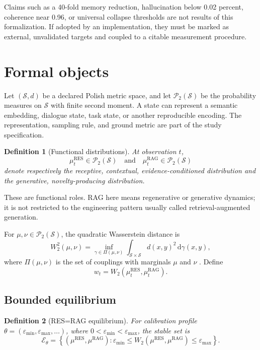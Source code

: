 \documentclass[11pt]{article}
\newcommand{\RES}{\mathrm{RES}}
\newcommand{\RAG}{\mathrm{RAG}}
\newcommand{\Wtwo}{W_2}
\newcommand{\Ptwo}{\mathcal P_2}
\newcommand{\State}{\mathcal S}
\newcommand{\Eband}{\mathcal E_{\theta}}
\newtheorem{definition}{Definition}
\begin{document}
Claims such as a 40-fold memory reduction, hallucination below
0.02 percent, coherence near 0.96, or universal collapse thresholds are not
results of this formalization. If adopted by an implementation, they must be
marked as external, unvalidated targets and coupled to a citable measurement
procedure.

\section{Formal objects}

Let $(\State,d)$ be a declared Polish metric space, and let
$\Ptwo(\State)$ be the probability measures on $\State$ with finite second
moment. A state can represent a semantic embedding, dialogue state, task state,
or another reproducible encoding. The representation, sampling rule, and ground
metric are part of the study specification.

\begin{definition}[Functional distributions]
At observation $t$,
\[
\mu_t^{\RES}\in\Ptwo(\State)
\quad\text{and}\quad
\mu_t^{\RAG}\in\Ptwo(\State)
\]
denote respectively the receptive, contextual, evidence-conditioned
distribution and the generative, novelty-producing distribution.
\end{definition}

These are functional roles. RAG here means regenerative or generative
dynamics; it is not restricted to the engineering pattern usually called
retrieval-augmented generation.

For $\mu,\nu\in\Ptwo(\State)$, the quadratic Wasserstein distance is
\begin{equation}
\Wtwo^2(\mu,\nu)
=
\inf_{\gamma\in\Pi(\mu,\nu)}
\int_{\State\times\State}d(x,y)^2\,\mathrm d\gamma(x,y),
\label{eq:w2}
\end{equation}
where $\Pi(\mu,\nu)$ is the set of couplings with marginals $\mu$ and $\nu$
\citep{villani2009,ambrosio2008}. Define
\begin{equation}
w_t=\Wtwo\!\left(\mu_t^{\RES},\mu_t^{\RAG}\right).
\label{eq:separation}
\end{equation}

\subsection{Bounded equilibrium}

\begin{definition}[RES=RAG equilibrium]
For calibration profile
$\theta=(\varepsilon_{\min},\varepsilon_{\max},\ldots)$, where
$0<\varepsilon_{\min}<\varepsilon_{\max}$, the stable set is
\begin{equation}
\Eband=
\left\{
(\mu^\RES,\mu^\RAG):
\varepsilon_{\min}\leq
\Wtwo(\mu^\RES,\mu^\RAG)
\leq\varepsilon_{\max}
\right\}.
\label{eq:band}
\end{equation}
\end{definition}
\end{document}
